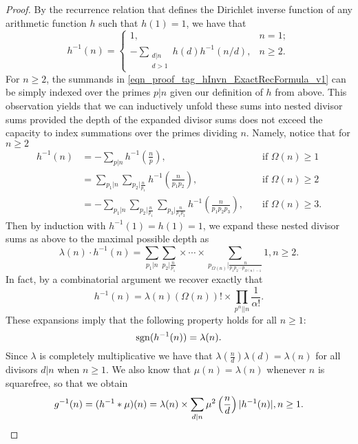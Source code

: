 \documentclass[11pt,reqno,a4letter]{article}
\numberwithin{figure}{section}
\numberwithin{table}{section}
\theoremstyle{plain}
\numberwithin{theorem}{section}
\theoremstyle{definition}
\begin{document}
\begin{proof}
By the recurrence relation that defines the Dirichlet inverse function of any 
arithmetic function $h$ such that $h(1) = 1$, we have that \cite[\S 2.7]{APOSTOLANUMT} 
\begin{equation} 
\label{eqn_proof_tag_hInvn_ExactRecFormula_v1}
h^{-1}(n) = \begin{cases} 
            1, & n = 1; \\ 
            -\sum\limits_{\substack{d|n \\ d>1}} h(d) h^{-1}(n/d), & n \geq 2. 
            \end{cases} 
\end{equation} 
For $n \geq 2$, the summands in \eqref{eqn_proof_tag_hInvn_ExactRecFormula_v1} 
can be simply indexed over the primes $p|n$ given our definition of $h$ from above. 
This observation yields that we can inductively 
unfold these sums into nested divisor sums provided the depth of the 
expanded divisor sums does not exceed the 
capacity to index summations over the primes dividing $n$. Namely, notice that for $n \geq 2$ 
\begin{align*} 
h^{-1}(n) & = -\sum_{p|n} h^{-1}\left(\frac{n}{p}\right), && \text{\ if\ } \Omega(n) \geq 1 \\ 
     & = \sum_{p_1|n} \sum_{p_2|\frac{n}{p_1}} h^{-1}\left(\frac{n}{p_1p_2}\right), && \text{\ if\ } \Omega(n) \geq 2 \\ 
     & = -\sum_{p_1|n} \sum_{p_2|\frac{n}{p_1}} \sum_{p_3|\frac{n}{p_1p_2}} h^{-1}\left(\frac{n}{p_1p_2p_3}\right), 
     && \text{\ if\ } \Omega(n) \geq 3. 
\end{align*} 
Then by induction with $h^{-1}(1) = h(1) = 1$, we expand these 
nested divisor sums as above to the maximal possible depth as 
\begin{equation} 
\label{eqn_proof_tag_hInvn_ExactNestedSumFormula_v2} 
\lambda(n) \cdot h^{-1}(n) = \sum_{p_1|n} \sum_{p_2|\frac{n}{p_1}} \times \cdots \times 
     \sum_{p_{\Omega(n)}|\frac{n}{p_1p_2 \cdots p_{\Omega(n)-1}}} 1, n \geq 2. 
\end{equation} 
In fact, by a combinatorial argument we recover exactly that 
\begin{equation} 
\label{eqn_proof_tag_hInvn_ExactNestedSumFormula_CombInterpetIdent_v3} 
h^{-1}(n) = \lambda(n) (\Omega(n))! \times \prod_{p^{\alpha} || n} \frac{1}{\alpha!}. 
\end{equation} 
These expansions imply that the following property holds for all $n \geq 1$: 
\begin{equation} 
\notag 
\operatorname{sgn}(h^{-1}(n)) = \lambda(n). 
\end{equation} 
Since $\lambda$ is completely multiplicative we have that 
$\lambda\left(\frac{n}{d}\right) \lambda(d) = \lambda(n)$ for all divisors 
$d|n$ when $n \geq 1$. We also know that $\mu(n) = \lambda(n)$ whenever $n$ is squarefree, 
so that we obtain
\[
g^{-1}(n) = (h^{-1} \ast \mu)(n) = \lambda(n) \times \sum_{d|n} \mu^2\left(\frac{n}{d}\right) |h^{-1}(n)|, n \geq 1. 
     \qedhere 
\]
\end{proof} 
\end{document}
